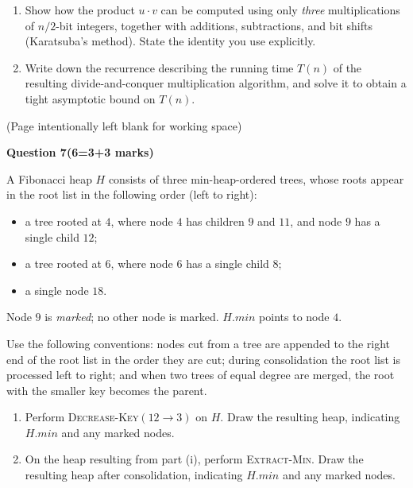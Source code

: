 \documentclass[12pt,letterpaper]{article}
\newcommand{\marksbox}[1]{%
  \vfill
  \begin{flushright}
    \fbox{\parbox[c][1.1cm][c]{1.3cm}{\centering #1}}
  \end{flushright}
}
\newcommand{\questiontitle}[2]{%
  \textbf{Question #1}\hfill\textbf{(#2 marks)}
}
\newcommand{\workingpage}{%
  \newpage
  \begin{center}
    (Page intentionally left blank for working space)
  \end{center}
}
\begin{document}
\begin{enumerate}
  \item[(i)] Show how the product $u \cdot v$ can be computed using only
  \emph{three} multiplications of $n/2$-bit integers, together with additions,
  subtractions, and bit shifts (Karatsuba's method). State the identity you
  use explicitly.

  \item[(ii)] Write down the recurrence describing the running time $T(n)$ of
  the resulting divide-and-conquer multiplication algorithm, and solve it to
  obtain a tight asymptotic bound on $T(n)$.
\end{enumerate}

\marksbox{6}

\workingpage
\newpage

\questiontitle{7}{6=3+3}

A Fibonacci heap $H$ consists of three min-heap-ordered trees, whose roots
appear in the root list in the following order (left to right):

\begin{itemize}
  \item a tree rooted at $4$, where node $4$ has children $9$ and $11$, and
  node $9$ has a single child $12$;
  \item a tree rooted at $6$, where node $6$ has a single child $8$;
  \item a single node $18$.
\end{itemize}

Node $9$ is \emph{marked}; no other node is marked. $H.min$ points to node
$4$.

Use the following conventions: nodes cut from a tree are appended to the right
end of the root list in the order they are cut; during consolidation the root
list is processed left to right; and when two trees of equal degree are
merged, the root with the smaller key becomes the parent.

\begin{enumerate}
  \item[(i)] Perform \textsc{Decrease-Key}$(12 \rightarrow 3)$ on $H$. Draw
  the resulting heap, indicating $H.min$ and any marked nodes.

  \item[(ii)] On the heap resulting from part (i), perform
  \textsc{Extract-Min}. Draw the resulting heap after consolidation,
  indicating $H.min$ and any marked nodes.
\end{enumerate}
\end{document}
